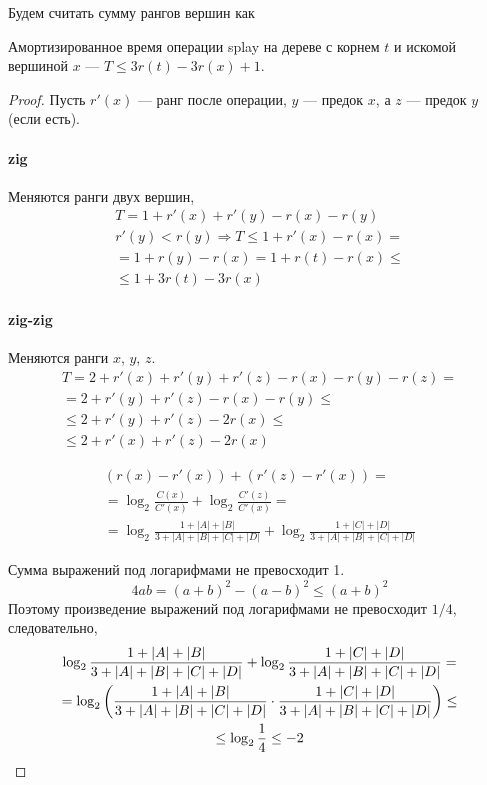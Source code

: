 Будем считать сумму рангов вершин как

\begin{theorem}
    Амортизированное время операции splay
    на дереве с корнем $t$ и искомой вершиной $x$
    --- $T \le 3r(t) - 3r(x) + 1$.
\end{theorem}
\begin{proof}
    Пусть $r'(x)$ --- ранг после операции,
    $y$ --- предок $x$, а $z$ --- предок $y$ (если есть).

    \paragraph{zig}
    Меняются ранги двух вершин,
    \begin{gather*}
        T = 1 + r'(x) + r'(y) - r(x) - r(y) \\
        r'(y) < r(y) \Rightarrow T \le 1 + r'(x) - r(x) = \\
        = 1 + r(y) - r(x) = 1 + r(t) - r(x) \le \\
        \le 1 + 3 r(t) - 3 r(x)
    \end{gather*}

    \paragraph{zig-zig}
    Меняются ранги $x$, $y$, $z$.
    \begin{gather*}
        T = 2 + r'(x) + r'(y) + r'(z) - r(x) - r(y) - r(z) = \\
        = 2 + r'(y) + r'(z) - r(x) - r(y) \le \\
        \le 2 + r'(y) + r'(z) - 2 r(x) \le \\
        \le 2 + r'(x) + r'(z) - 2 r(x)
    \end{gather*}

    \begin{gather*}
        (r(x) - r'(x)) + (r'(z) - r'(x)) = \\
        = \log_2 \frac{C(x)}{C'(x)} + \log_2 \frac{C'(z)}{C'(x)} = \\
        = \log_2 \frac{1 + |A| + |B|}{3 + |A| + |B| + |C| + |D|}
        + \log_2 \frac{1 + |C| + |D|}{3 + |A| + |B| + |C| + |D|}
    \end{gather*}

    Сумма выражений под логарифмами не превосходит 1.
    \[
        4ab = (a + b)^2 - (a - b)^2 \le (a + b)^2
    \]
    Поэтому произведение выражений под логарифмами
    не превосходит $1/4$, следовательно,
    \begin{gather*}
        \log_2 \frac{1 + |A| + |B|}{3 + |A| + |B| + |C| + |D|}
        + \log_2 \frac{1 + |C| + |D|}{3 + |A| + |B| + |C| + |D|} = \\
        = \log_2 \left( 
            \frac{1 + |A| + |B|}{3 + |A| + |B| + |C| + |D|} \cdot
            \frac{1 + |C| + |D|}{3 + |A| + |B| + |C| + |D|} \right) \le \\
        \le \log_2 \frac{1}{4} \le -2
    \end{gather*}


\end{proof}
